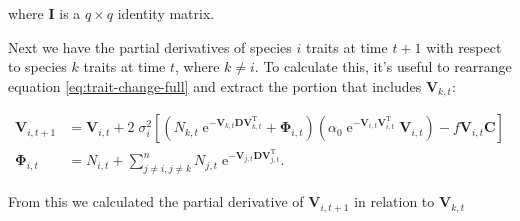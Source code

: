 \noindent where $\mathbf{I}$ is a $q \times q$ identity matrix.


Next we have the partial derivatives of species $i$ traits at time $t+1$ with respect to 
species $k$ traits at time $t$, where $k \ne i$.
To calculate this, it's useful to rearrange equation \ref{eq:trait-change-full} and
extract the portion that includes $\mathbf{V}_{k,t}$:





\begin{equation*}
\begin{split}
    \mathbf{V}_{i,t+1} &= \mathbf{V}_{i,t} + 2 \; \sigma_i^2
    \left[
        \left(
            N_{k,t} \; \textrm{e}^{-\mathbf{V}_{k,t} \mathbf{D} \mathbf{V}_{k,t}^\textrm{T}} +
            \mathbf{\Phi}_{i,t}
        \right)
        \left(
            \alpha_0 \; \textrm{e}^{-\mathbf{V}_{i,t}
            \mathbf{V}_{i,t}^\textrm{T}} \; \mathbf{V}_{i,t}
        \right)
        - f \mathbf{V}_{i,t} \mathbf{C}
    \right] \\
    \mathbf{\Phi}_{i,t} &= N_{i,t} + \sum_{j \ne i, j \ne k}^{n}{
        N_{j,t} \; \textrm{e}^{- \mathbf{V}_{j,t} \mathbf{D}
        \mathbf{V}_{j,t}^{\textrm{T}}} }
    \textrm{.}
\end{split}
\end{equation*}

From this we calculated the partial derivative of $\mathbf{V}_{i,t+1}$ in relation to
$\mathbf{V}_{k,t}$


